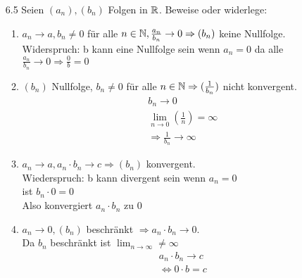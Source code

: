 \documentclass{HM}
\begin{document}
\begin{enumerate}
\begin{enumerate}
	\end{enumerate}
	\item[6.5] Seien $(a_n), (b_n)$ Folgen in $\mathbb{R}$. Beweise oder widerlege:
	\begin{enumerate}
		\item $a_n\to a, b_n\neq 0$ für alle $n\in\mathbb{N}, \frac{a_n}{b_n}\to 0 \Rightarrow (b_n)$ keine Nullfolge.\\
		Widerspruch: b kann eine Nullfolge sein wenn $a_n = 0$ da alle $\frac{a_n}{b_n}\to 0\Rightarrow\frac{0}{b}=0$ 
		\item $(b_n)$ Nullfolge, $b_n\neq 0$ für alle $n\in\mathbb{N}\Rightarrow (\frac{1}{b_n})$ nicht konvergent.\\
		\begin{align*}
			b_n \to 0\\
			\lim_{n\to 0}\left(\frac{1}{n}\right)=\infty\\
			\Rightarrow \frac{1}{b_n} \to \infty
		\end{align*}
		\item $a_n\to a, a_n\cdot b_n \to c \Rightarrow (b_n)$ konvergent.\\
		Wiederspruch: b kann divergent sein wenn $a_n = 0$\\
		ist $b_n \cdot 0 = 0$\\
		Also konvergiert $a_n \cdot b_n$ zu $0$ 
		\item $a_n\to 0, (b_n)$ beschränkt $\Rightarrow a_n\cdot b_n \to 0$.\\
		Da $b_n$ beschränkt ist $\lim_{n\to \infty} \neq \infty$
		\begin{align*}
			a_n \cdot b_n \to c\\
			\Leftrightarrow 0 \cdot b = c
		\end{align*}
		

\end{enumerate}
\end{enumerate}
\end{document}

